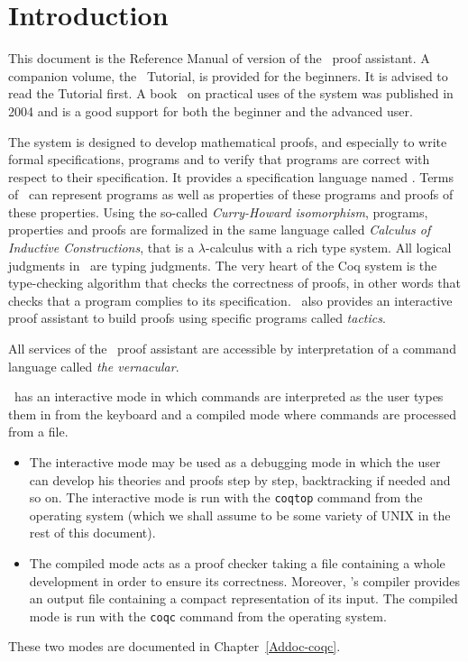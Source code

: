 \chapter*{Introduction}

This document is the Reference Manual of version \coqversion{} of the \Coq\ 
proof assistant. A companion volume, the \Coq\ Tutorial, is provided
for the beginners. It is advised to read the Tutorial first.
A book~\cite{CoqArt} on practical uses of the \Coq{} system was published in 2004 and is a good support for both the beginner and
the advanced user.

The \Coq{} system is designed to develop mathematical proofs, and
especially to write formal specifications, programs and to verify that
programs are correct with respect to their specification. It provides
a specification language named \gallina. Terms of \gallina\ can
represent programs as well as properties of these programs and proofs
of these properties. Using the so-called \textit{Curry-Howard
  isomorphism}, programs, properties and proofs are formalized in the
same language called \textit{Calculus of Inductive Constructions},
that is a $\lambda$-calculus with a rich type system.  All logical
judgments in \Coq\ are typing judgments. The very heart of the Coq
system is the type-checking algorithm that checks the correctness of
proofs, in other words that checks that a program complies to its
specification. \Coq\ also provides an interactive proof assistant to
build proofs using specific programs called \textit{tactics}.

All services of the \Coq\ proof assistant are accessible by
interpretation of a command language called \textit{the vernacular}.

\Coq\ has an interactive mode in which commands are interpreted as the
user types them in from the keyboard and a compiled mode where
commands are processed from a file.  

\begin{itemize}
\item The interactive mode may be used as a debugging mode in which
  the user can develop his theories and proofs step by step,
  backtracking if needed and so on. The interactive mode is run with
  the {\tt coqtop} command from the operating system (which we shall
  assume to be some variety of UNIX in the rest of this document).
\item The compiled mode acts as a proof checker taking a file
  containing a whole development in order to ensure its correctness.
  Moreover, \Coq's compiler provides an output file containing a
  compact representation of its input. The compiled mode is run with
  the {\tt coqc} command from the operating system. 

\end{itemize}
These two modes are documented in Chapter~\ref{Addoc-coqc}.

